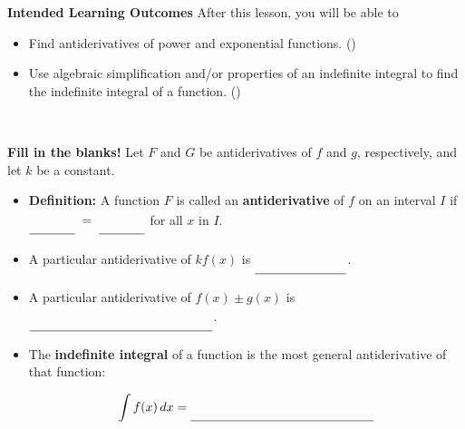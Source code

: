 \documentclass[10pt]{article}
\begin{document}
\pagestyle{otherpages}
\thispagestyle{firstpage}

\textbf{Intended Learning Outcomes}
After this lesson, you will be able to 

\begin{itemize}
    \item Find antiderivatives of power and exponential functions. ()
    \item Use algebraic simplification and/or properties of an indefinite integral to find the indefinite integral of a function. ()
\end{itemize}

\vspace{-0.6cm}

\hrulefill\\


{\bf\color{blue} Fill in the blanks!} Let $F$ and $G$ be antiderivatives of $f$ and $g$, respectively, and let $k$ be a constant.

\begin{itemize}

\item {\bf Definition:} A function $F$ is called an {\bf antiderivative} of $f$ on an interval $I$ if $\unlineb{.5}{} \;=\; \unlineb{.5}{}$ for all $x$ in $I$.\\

\item A particular antiderivative of $kf(x)$ is \dotfill $\unlineb{1}{}$.\\

\item A particular antiderivative of $f(x)\pm g(x)$ is \dotfill $\unlineb{2}{}$.\\

\item The {\bf indefinite integral} of a function is the most general antiderivative of that function: 

\[\dint f(x)\,dx = \unlineb{2}{}\]

\end{itemize}

\

\hrulefill

\

\end{document}
